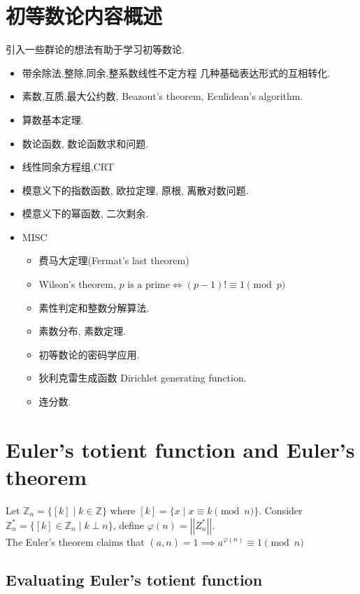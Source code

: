 \documentclass{article}
\newcommand{\ZZ}{\mathbb{Z}}
\begin{document}
\tableofcontents

\newpage

\section{初等数论内容概述}

引入一些群论的想法有助于学习初等数论.

\begin{itemize}
	\item 带余除法,整除,同余,整系数线性不定方程 几种基础表达形式的互相转化.
	\item 素数,互质,最大公约数, Beazout's theorem, Eculidean's algorithm.
	\item 算数基本定理.
	\item 数论函数, 数论函数求和问题.
	\item 线性同余方程组,CRT
	\item 模意义下的指数函数, 欧拉定理, 原根, 离散对数问题.
	\item 模意义下的幂函数, 二次剩余.
	\item MISC
	      \begin{itemize}
		      \item 费马大定理(Fermat's last theorem)
		      \item Wilson's theorem, $p\text{ is a prime} \iff (p-1)!\equiv 1\pmod p$
		      \item 素性判定和整数分解算法.
		      \item 素数分布, 素数定理.
		      \item 初等数论的密码学应用.
		      \item 狄利克雷生成函数 Dirichlet generating function.
		      \item 连分数.
	      \end{itemize}
\end{itemize}

\newpage

\section{Euler's totient function and Euler's theorem}

Let $\ZZ_n=\{[k]\mid k\in \ZZ \}$ where $[k]=\{ x\mid x\equiv k\pmod n \}$.
Consider $\ZZ_n^\ast = \{[k]\in \ZZ_n \mid k\perp n\}$, define $\varphi(n)=\left\vert|Z_n^\ast|\right\vert$.\\
The Euler's theorem claims that $(a,n)=1\implies a^{\varphi(n)}\equiv 1\pmod n$

\subsection{Evaluating Euler's totient function}
\end{document}

